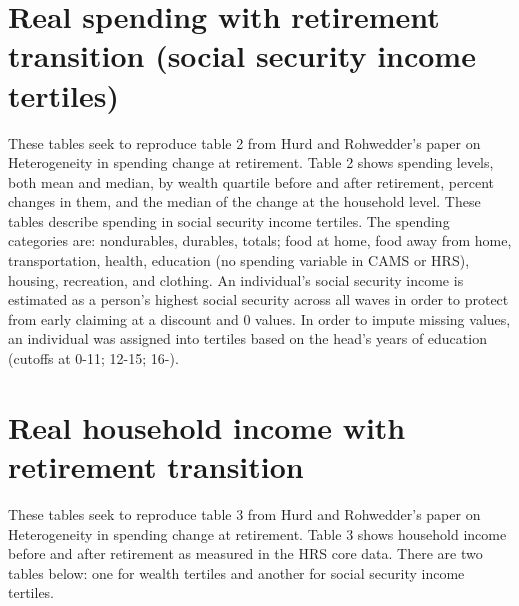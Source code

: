 \documentclass{article}
\begin{document}
\section{Real spending with retirement transition (social security income tertiles)} 
These tables seek to reproduce table 2 from Hurd and Rohwedder's paper on Heterogeneity in spending change at retirement. Table 2 shows spending levels, both mean and median, by wealth quartile before and after retirement, percent changes in them, and the median of the change at the household level. 
\newline
\newline
These tables describe spending in social security income tertiles. The spending categories are: nondurables, durables, totals; food at home, food away from home, transportation, health, education (no spending variable in CAMS or HRS), housing, recreation, and clothing.
\newline
An individual’s social security income is estimated as a person's highest social security across all waves in order to protect from early claiming at a discount and 0 values. In order to impute missing values, an individual was assigned into tertiles based on the head's years of education (cutoffs at 0-11; 12-15; 16-).











\FloatBarrier

\section{Real household income with retirement transition} 
These tables seek to reproduce table 3 from Hurd and Rohwedder's paper on Heterogeneity in spending change at retirement.  Table 3 shows household income before and after retirement as measured in the HRS core data. There are two tables below: one for wealth tertiles and another for social security income tertiles. 


\FloatBarrier
\end{document}
